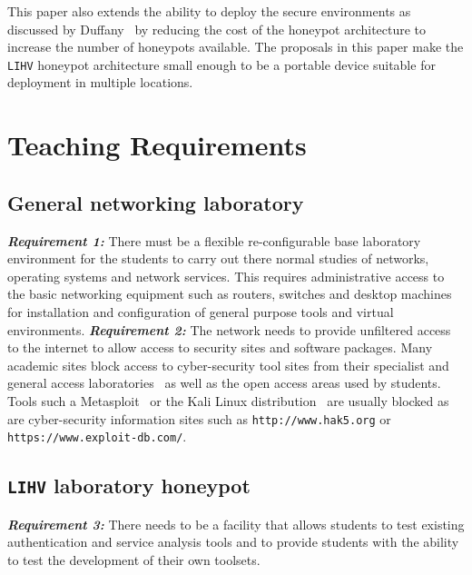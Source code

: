 This paper also extends the ability to deploy the secure environments as discussed by Duffany~\cite{JD:08} by reducing the cost of the honeypot architecture to increase the number of honeypots available. The proposals in this paper make the \texttt{LIHV} honeypot architecture small enough to be a portable device suitable for deployment in multiple locations.

\section{Teaching Requirements}\label{sec:TeachingRequire}

\subsection{General networking laboratory}\label{subsec:GeneralLab}
\noindent \emph{\textbf{Requirement 1:}} There must be a flexible re-configurable base laboratory environment for the students to carry out there normal studies of networks, operating systems and network services. This requires administrative access to the basic networking equipment such as routers, switches and desktop machines for installation and configuration of general purpose tools and virtual environments.
\newline\newline
\noindent \emph{\textbf{Requirement 2:}} The network needs to provide unfiltered access to the internet to allow access to security sites and software packages. Many academic sites block access to cyber-security tool sites from their specialist and general access laboratories~\cite{ACGO:06,YYLCHJ:04} as well as the open access areas used by students. Tools such a Metasploit~\cite{R7:17} or the Kali Linux distribution~\cite{OS:17} are usually blocked as are cyber-security information sites such as \texttt{http://www.hak5.org} or \texttt{https://www.exploit-db.com/}.

\subsection{\texttt{LIHV} laboratory honeypot}\label{subsec:LabHoneypot}
\noindent \emph{\textbf{Requirement 3:}} There needs to be a facility that allows students to test existing authentication and service analysis tools and to provide students with the ability to test the development of their own toolsets. 

